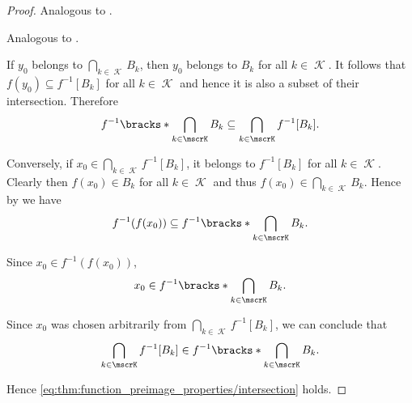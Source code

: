 \begin{proof}
   Analogous to .

   Analogous to .

   If \( y_0 \) belongs to \( \bigcap_{k \in \mscrK} B_k \), then \( y_0 \) belongs to \( B_k \) for all \( k \in \mscrK \). It follows that \( f(y_0) \subseteq f^{-1}[B_k] \) for all \( k \in \mscrK \) and hence it is also a subset of their intersection. Therefore
  \begin{equation*}
    f^{-1} \bracks*{ \bigcap_{k \in \mscrK} B_k } \subseteq \bigcap_{k \in \mscrK} f^{-1}[B_k].
  \end{equation*}

  Conversely, if \( x_0 \in \bigcap_{k \in \mscrK} f^{-1}[B_k] \), it belongs to \( f^{-1}[B_k] \) for all \( k \in \mscrK \). Clearly then \( f(x_0) \in B_k \) for all \( k \in \mscrK \) and thus \( f(x_0) \in \bigcap_{k \in \mscrK} B_k \). Hence by  we have
  \begin{equation*}
    f^{-1}(f(x_0))
    \subseteq
    f^{-1}\bracks*{ \bigcap_{k \in \mscrK} B_k }.
  \end{equation*}

  Since \( x_0 \in f^{-1}(f(x_0)) \),
  \begin{equation*}
    x_0 \in f^{-1}\bracks*{ \bigcap_{k \in \mscrK} B_k }.
  \end{equation*}

  Since \( x_0 \) was chosen arbitrarily from \( \bigcap_{k \in \mscrK} f^{-1}[B_k] \), we can conclude that
  \begin{equation*}
    \bigcap_{k \in \mscrK} f^{-1}[B_k] \in f^{-1}\bracks*{ \bigcap_{k \in \mscrK} B_k }.
  \end{equation*}

  Hence \eqref{eq:thm:function_preimage_properties/intersection} holds.


\end{proof}
